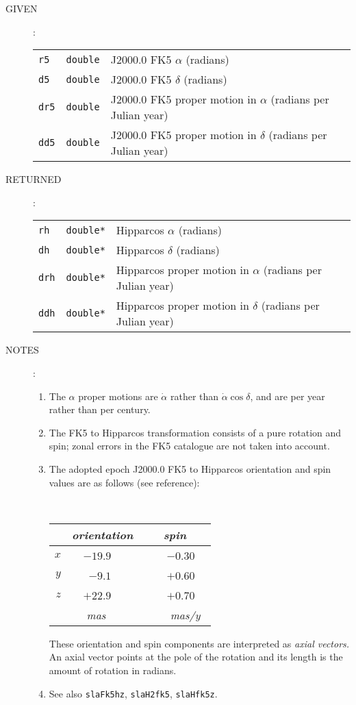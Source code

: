 \documentclass[11pt,fleqn,twoside]{article}
\renewcommand{\_}{{\tt\char'137}}     %
\newlength{\oldspacing}
\newcommand{\args}[2]
{
  \goodbreak
  \setlength{\oldspacing}{\topsep}
  \setlength{\topsep}{0.3ex}
  \begin{description}
  \item[#1]:\\[1.5ex]
    \begin{tabular}{p{6.7em}p{6.8em}p{22em}}
      #2
    \end{tabular}
  \end{description}
  \setlength{\topsep}{\oldspacing}
}
\newcommand{\spec}[3]
{
  {\tt \mbox{#1}} & {\tt \mbox{#2}} & {#3}
}
\newcommand{\notes}[1]
{
  \goodbreak
  \setlength{\oldspacing}{\topsep}
  \setlength{\topsep}{0.3ex}
  \begin{description}
    \item[NOTES]:
        #1
  \end{description}
  \setlength{\topsep}{\oldspacing}
}
\begin{document}
\args{GIVEN}
{
 \spec{r5}{double}{J2000.0 FK5 $\alpha$ (radians)} \\
 \spec{d5}{double}{J2000.0 FK5 $\delta$ (radians)} \\
 \spec{dr5}{double}{J2000.0 FK5 proper motion in $\alpha$
                              (radians per Julian year)} \\
 \spec{dd5}{double}{J2000.0 FK5 proper motion in $\delta$
                              (radians per Julian year)}
}
\args{RETURNED}
{
 \spec{rh}{double*}{Hipparcos $\alpha$ (radians)} \\
 \spec{dh}{double*}{Hipparcos $\delta$ (radians)} \\
 \spec{drh}{double*}{Hipparcos proper motion in $\alpha$
                              (radians per Julian year)} \\
 \spec{ddh}{double*}{Hipparcos proper motion in $\delta$
                              (radians per Julian year)}
}
\notes
{
 \begin{enumerate}
  \item The $\alpha$ proper motions are $\dot{\alpha}$ rather than
        $\dot{\alpha}\cos\delta$, and are per year rather than per century.
  \item The FK5 to Hipparcos
        transformation consists of a pure rotation and spin;
        zonal errors in the FK5 catalogue are not taken into account.
  \item The adopted epoch J2000.0 FK5 to Hipparcos orientation and spin
        values are as follows (see reference):
 
        \vspace{2ex}
 
        ~~~~~~~~~~~~
        \begin{tabular}{|r|r|r|} \hline
        &
        \multicolumn{1}{|c}{\it orientation} &
        \multicolumn{1}{|c|}{\it ~~~spin~~~} \\ \hline
        $x$ & $-19.9$~~~~ & ~$-0.30$~~ \\
        $y$ &  $-9.1$~~~~ & ~$+0.60$~~ \\
        $z$ & $+22.9$~~~~ & ~$+0.70$~~ \\ \hline
        & {\it mas}~~~~~ & ~{\it mas/y}~ \\ \hline
        \end{tabular}
 
        \vspace{3ex}
 
        These orientation and spin components are interpreted as
        {\it axial vectors.}  An axial vector points at the pole of
        the rotation and its length is the amount of rotation in radians.
  \item See also {\tt slaFk5hz}, {\tt slaH2fk5}, {\tt slaHfk5z}.
 \end{enumerate}
}
\end{document}
